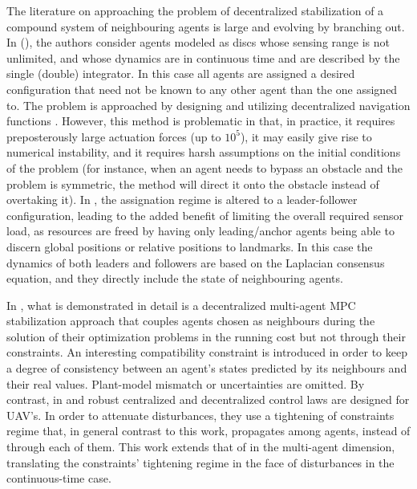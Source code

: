 The literature on approaching the problem of decentralized stabilization of a
compound system of neighbouring agents is large and evolving by branching out.
In \cite{1470732} (\cite{00207170600867123}), the authors consider agents modeled
as discs whose sensing range is not unlimited, and whose dynamics are in
continuous time and are described by the single (double) integrator. In this case
all agents are assigned a desired configuration that need not be known to
any other agent than the one assigned to. The problem is approached by
designing and utilizing decentralized navigation functions \cite{Lav06}.
However, this method is problematic in that, in practice, it requires
preposterously large actuation forces (up to $10^5$), it may easily give rise to
numerical instability, and it requires harsh assumptions on the initial
conditions of the problem (for instance, when an agent needs to bypass an
obstacle and the problem is symmetric, the method will direct it onto the
obstacle instead of overtaking it). In \cite{Gustavi2010133}, the assignation
regime is altered to a leader-follower configuration, leading to the added
benefit of limiting the overall required sensor load, as resources are freed
by having only leading/anchor agents being able to discern global positions or
relative positions to landmarks.  In this case the dynamics of both leaders and
followers are based on the Laplacian consensus equation, and they directly
include the state of neighbouring agents.

In \cite{Dunbar2006549}, what is demonstrated in detail is a decentralized
multi-agent MPC stabilization approach that couples agents chosen as neighbours
during the solution of their optimization problems in the running cost but not
through their constraints. An interesting compatibility constraint is introduced
in order to keep a degree of consistency between an agent's states predicted by
its neighbours and their real values. Plant-model mismatch or uncertainties are
omitted.  By contrast, in \cite{1383977} and \cite{1429425} robust centralized
and decentralized control laws are designed for UAV's. In order to attenuate
disturbances, they use a tightening of constraints regime that, in general
contrast to this work, propagates among agents, instead of through each of them.
This work extends that of \cite{1185106} in the multi-agent dimension,
translating the constraints' tightening regime in the face of disturbances
in the continuous-time case.

